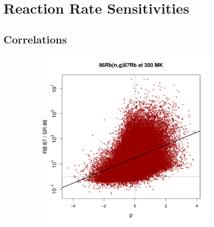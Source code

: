 
\section{Reaction Rate Sensitivities} \label{sec:rate_sensitivities}

\subsection{Correlations}

\begin{figure}[t]
\centering
\begin{subfigure}[b]{0.495\textwidth}
\centering
\includegraphics[width=\textwidth]{Chapter-3/figs/CorrRB87SR86_86Rb_n_g_87Rb_300MK.png}  
\end{subfigure}
\hfill
\begin{subfigure}[b]{0.495\textwidth}  
\centering 

\end{subfigure}
\end{figure}
